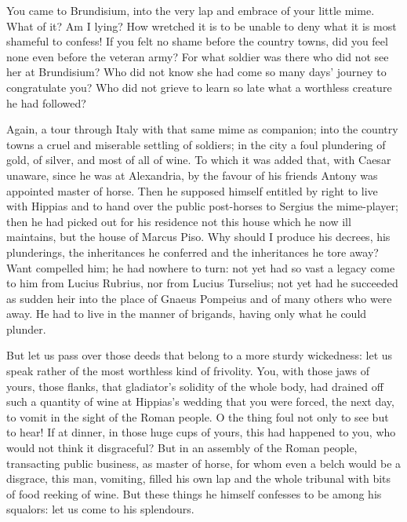  You came to Brundisium, into the very lap and embrace of your little mime. What of it? Am I lying? How wretched it is to be unable to deny what it is most shameful to confess! If you felt no shame before the country towns, did you feel none even before the veteran army? For what soldier was there who did not see her at Brundisium? Who did not know she had come so many days' journey to congratulate you? Who did not grieve to learn so late what a worthless creature he had followed?

 Again, a tour through Italy with that same mime as companion; into the country towns a cruel and miserable settling of soldiers; in the city a foul plundering of gold, of silver, and most of all of wine. To which it was added that, with Caesar unaware, since he was at Alexandria, by the favour of his friends Antony was appointed master of horse. Then he supposed himself entitled by right to live with Hippias and to hand over the public post-horses to Sergius the mime-player; then he had picked out for his residence not this house which he now ill maintains, but the house of Marcus Piso. Why should I produce his decrees, his plunderings, the inheritances he conferred and the inheritances he tore away? Want compelled him; he had nowhere to turn: not yet had so vast a legacy come to him from Lucius Rubrius, nor from Lucius Turselius; not yet had he succeeded as sudden heir into the place of Gnaeus Pompeius and of many others who were away. He had to live in the manner of brigands, having only what he could plunder.

 But let us pass over those deeds that belong to a more sturdy wickedness: let us speak rather of the most worthless kind of frivolity. You, with those jaws of yours, those flanks, that gladiator's solidity of the whole body, had drained off such a quantity of wine at Hippias's wedding that you were forced, the next day, to vomit in the sight of the Roman people. O the thing foul not only to see but to hear! If at dinner, in those huge cups of yours, this had happened to you, who would not think it disgraceful? But in an assembly of the Roman people, transacting public business, as master of horse, for whom even a belch would be a disgrace, this man, vomiting, filled his own lap and the whole tribunal with bits of food reeking of wine. But these things he himself confesses to be among his squalors: let us come to his splendours.

